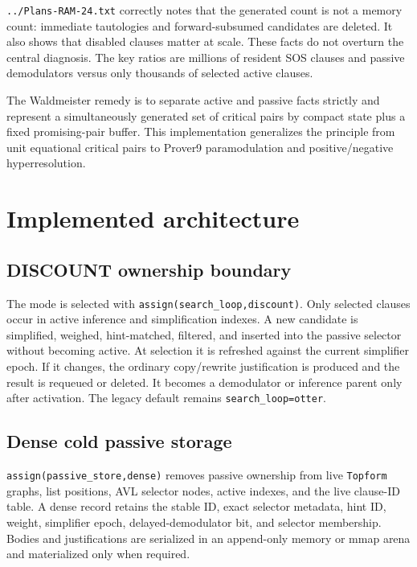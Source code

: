 \documentclass[11pt]{article}
\newcommand{\setting}[1]{\texttt{#1}}
\begin{document}
\setting{../Plans-RAM-24.txt} correctly notes that the generated count is not a
memory count: immediate tautologies and forward-subsumed candidates are
deleted.  It also shows that disabled clauses matter at scale.  These facts do
not overturn the central diagnosis.  The key ratios are millions of resident
SOS clauses and passive demodulators versus only thousands of selected active
clauses.

The Waldmeister remedy is to separate active and passive facts strictly and
represent a simultaneously generated set of critical pairs by compact state
plus a fixed promising-pair buffer.  This implementation generalizes the
principle from unit equational critical pairs to Prover9 paramodulation and
positive/negative hyperresolution.

\section{Implemented architecture}

\subsection{DISCOUNT ownership boundary}

The mode is selected with \setting{assign(search\_loop,discount)}.  Only
selected clauses occur in active inference and simplification indexes.  A new
candidate is simplified, weighed, hint-matched, filtered, and inserted into the
passive selector without becoming active.  At selection it is refreshed
against the current simplifier epoch.  If it changes, the ordinary copy/rewrite
justification is produced and the result is requeued or deleted.  It becomes a
demodulator or inference parent only after activation.  The legacy default
remains \setting{search\_loop=otter}.

\subsection{Dense cold passive storage}

\setting{assign(passive\_store,dense)} removes passive ownership from live
\setting{Topform} graphs, list positions, AVL selector nodes, active indexes,
and the live clause-ID table.  A dense record retains the stable ID, exact
selector metadata, hint ID, weight, simplifier epoch, delayed-demodulator bit,
and selector membership.  Bodies and justifications are serialized in an
append-only memory or mmap arena and materialized only when required.
\end{document}
